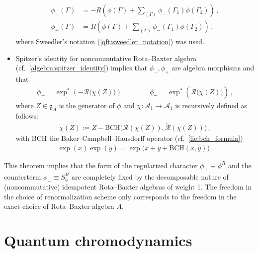 \begin{theorem}
\begin{itemize}
\begin{gather}
\begin{aligned}
                    \phi_-(\Gamma) &= -R\left(\phi(\Gamma) + \sum_{(\Gamma)}\phi_-(\Gamma_1)\phi(\Gamma_2)\right)\,,\\
                    \phi_+(\Gamma) &= \widetilde{R}\left(\phi(\Gamma) + \sum_{(\Gamma)}\phi_-(\Gamma_1)\phi(\Gamma_2)\right)\,,
                \end{aligned}
            \end{gather}
            where Sweedler's notation (\cref{qft:sweedler_notation}) was used.
            \item Spitzer's identity for noncommutative Rota--Baxter algebra (cf.~\cref{algebra:spitzer_identity}) implies that $\phi_-,\phi_+$ are algebra morphisms and that
            \begin{gather}
                \phi_- = \exp^*\left(-\mathcal{R}\bigl(\chi(Z)\bigr)\right) \qquad\qquad \phi_+ = \exp^*\left(\widetilde{\mathcal{R}}\bigl(\chi(Z)\bigr)\right)\,,
            \end{gather}
            where $Z\in\mathfrak{g}_A$ is the generator of $\phi$ and $\chi:\mathcal{A}_1\rightarrow\mathcal{A}_1$ is recursively defined as follows:
            \begin{gather}
                \chi(Z) := Z - \mathrm{BCH}\bigl(\mathcal{R}(\chi(Z)),\widetilde{\mathcal{R}}(\chi(Z))\bigr)\,,
            \end{gather}
            with $\mathrm{BCH}$ the Baker--Campbell--Hausdorff operator (cf.~\cref{lie:bch_formula})
            \begin{gather}
                \exp(x)\exp(y) = \exp\bigl(x+y+\mathrm{BCH}(x,y)\bigr)\,.
            \end{gather}
        \end{itemize}
    \end{theorem}

    This theorem implies that the form of the regularized character $\phi_+\equiv\phi^R$ and the counterterm $\phi_-\equiv S_\phi^R$ are completely fixed by the decomposable nature of (noncommutative) idempotent Rota--Baxter algebras of weight 1. The freedom in the choice of renormalization scheme only corresponds to the freedom in the exact choice of Rota--Baxter algebra $A$.


\section{Quantum chromodynamics}

